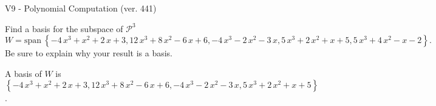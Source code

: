 \begin{exercise}
  \begin{exerciseTitle}V9 - Polynomial Computation (ver. 441)\end{exerciseTitle}
  \begin{exerciseStatement}
    Find a basis for the subspace of \(\mathcal{P}^3\) 
\[W=\mathrm{span}\ \left\{-4 \, x^{3} + x^{2} + 2 \, x + 3 , 12 \, x^{3} + 8 \, x^{2} - 6 \, x + 6 , -4 \, x^{3} - 2 \, x^{2} - 3 \, x , 5 \, x^{3} + 2 \, x^{2} + x + 5 , 5 \, x^{3} + 4 \, x^{2} - x - 2\right\}.\]
 Be sure to explain why your result is a basis.


  \end{exerciseStatement}
  \begin{exerciseAnswer}
   A basis of \(W\) is  \(\left\{-4 \, x^{3} + x^{2} + 2 \, x + 3 , 12 \, x^{3} + 8 \, x^{2} - 6 \, x + 6 , -4 \, x^{3} - 2 \, x^{2} - 3 \, x , 5 \, x^{3} + 2 \, x^{2} + x + 5\right\}\).
  


  \end{exerciseAnswer}
\end{exercise}